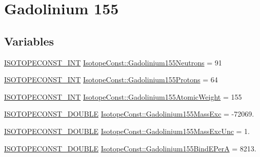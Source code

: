 \hypertarget{group___isotope_const-_gadolinium-_gd155}{}\section{Gadolinium 155}
\label{group___isotope_const-_gadolinium-_gd155}
\subsection*{Variables}
\begin{DoxyCompactItemize}
\item 
\mbox{\hyperlink{group___isotope_const-_macros_ga5f18360b3e99483a35c32d789e62621c}{I\+S\+O\+T\+O\+P\+E\+C\+O\+N\+S\+T\+\_\+\+I\+NT}} \mbox{\hyperlink{group___isotope_const-_gadolinium-_gd155_gad67092a5351c5b96ef4df9ffa0775f64}{Isotope\+Const\+::\+Gadolinium155\+Neutrons}} = 91
\item 
\mbox{\hyperlink{group___isotope_const-_macros_ga5f18360b3e99483a35c32d789e62621c}{I\+S\+O\+T\+O\+P\+E\+C\+O\+N\+S\+T\+\_\+\+I\+NT}} \mbox{\hyperlink{group___isotope_const-_gadolinium-_gd155_ga7348f16fd6262a8fcc429d91ec10a396}{Isotope\+Const\+::\+Gadolinium155\+Protons}} = 64
\item 
\mbox{\hyperlink{group___isotope_const-_macros_ga5f18360b3e99483a35c32d789e62621c}{I\+S\+O\+T\+O\+P\+E\+C\+O\+N\+S\+T\+\_\+\+I\+NT}} \mbox{\hyperlink{group___isotope_const-_gadolinium-_gd155_gada6574c9cc57a91ba882c83029cdbee4}{Isotope\+Const\+::\+Gadolinium155\+Atomic\+Weight}} = 155
\item 
\mbox{\hyperlink{group___isotope_const-_macros_ga8f45a7272ce02c0b4c65c44636ed719a}{I\+S\+O\+T\+O\+P\+E\+C\+O\+N\+S\+T\+\_\+\+D\+O\+U\+B\+LE}} \mbox{\hyperlink{group___isotope_const-_gadolinium-_gd155_ga5e42e3048c1b73d450f3f15ba0f6b92a}{Isotope\+Const\+::\+Gadolinium155\+Mass\+Exc}} = -\/72069.
\item 
\mbox{\hyperlink{group___isotope_const-_macros_ga8f45a7272ce02c0b4c65c44636ed719a}{I\+S\+O\+T\+O\+P\+E\+C\+O\+N\+S\+T\+\_\+\+D\+O\+U\+B\+LE}} \mbox{\hyperlink{group___isotope_const-_gadolinium-_gd155_ga0d9f9fdb741ce4aa59e7b5ef5f8e1f02}{Isotope\+Const\+::\+Gadolinium155\+Mass\+Exc\+Unc}} = 1.
\item 
\mbox{\hyperlink{group___isotope_const-_macros_ga8f45a7272ce02c0b4c65c44636ed719a}{I\+S\+O\+T\+O\+P\+E\+C\+O\+N\+S\+T\+\_\+\+D\+O\+U\+B\+LE}} \mbox{\hyperlink{group___isotope_const-_gadolinium-_gd155_gaff2ea4f1fcd5c15ef6fec25eb5a257a8}{Isotope\+Const\+::\+Gadolinium155\+Bind\+E\+PerA}} = 8213.
\item 

\end{DoxyCompactItemize}

